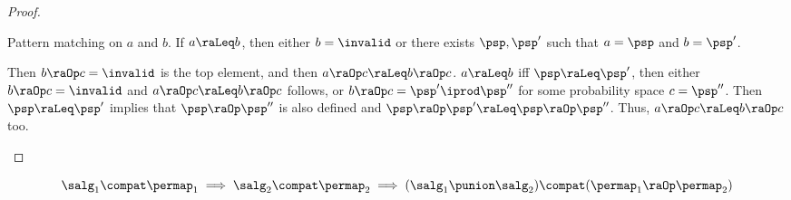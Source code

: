 \begin{proof}
\begin{induction}
      Pattern matching on $a$ and $b$.
      If $a \raLeq b $,
      then either $b = \invalid$ or there exists
       $\psp, \psp'$ such that $a = \psp$ and $b = \psp'$.
       \begin{casesplit}
         \case[$b = \invalid$] Then $b \raOp c = \invalid$ is the top element,
       and then $a \raOp c \raLeq b \raOp c$.
         \case[Otherwise]
       $a \raLeq b$ iff $\psp \raLeq \psp'$,
       then either $b \raOp c = \invalid$ and $a \raOp c \raLeq b \raOp c$ follows,
       or  $b \raOp c = \psp' \iprod \psp''$
       for some probability space $c = \psp''$.
       Then $\psp \raLeq \psp'$ implies that
       $\psp \raOp \psp''$ is also defined and
       $\psp \raOp \psp' \raLeq \psp \raOp \psp''$.
       Thus, $a \raOp c \raLeq b \raOp c$ too.
       \qedhere
      \end{casesplit}
  \end{induction}
\end{proof}




\begin{lemma} 
  \label{lemma:well-defined-psppmra-1}
   \[
  \salg_1\compat\permap_1
  \implies
  \salg_2\compat\permap_2
  \implies
    (\salg_1 \punion \salg_2)\compat(\permap_1 \raOp \permap_2)
  \]
\end{lemma}

